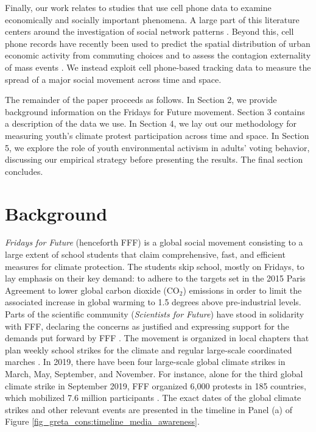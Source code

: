 Finally, our work relates to studies that use cell phone data to examine economically and socially important phenomena. A large part of this literature centers around the investigation of social network patterns \citep{onnela2007structure,onnela2011geographic,kovanen2013temporal}. Beyond this, cell phone records have recently been used to predict the spatial distribution of urban economic activity from commuting choices \citep{NBERw28516} and to assess the contagion externality of mass events \citep{dave2020contagion}. We instead exploit cell phone-based tracking data to measure the spread of a major social movement across time and space.


The remainder of the paper proceeds as follows. In Section 2, we provide background information on the Fridays for Future movement. Section 3 contains a description of the data we use. In Section 4, we lay out our methodology for measuring youth's climate protest participation across time and space. In Section 5, we explore the role of youth environmental activism in adults' voting behavior, discussing our empirical strategy before presenting the results. The final section concludes. 










\bigskip
\section{Background}\label{sec_greta_cons:background}
\afterpage{
	
}
\textit{Fridays for Future} (henceforth FFF) is a global social movement consisting to a large extent of school students that claim comprehensive, fast, and efficient measures for climate protection. The students skip school, mostly on Fridays, to lay emphasis on their key demand: to adhere to the targets set in the 2015 Paris Agreement to lower global carbon dioxide (CO$_2$) emissions in order to limit the associated increase in global warming to 1.5 degrees above pre-industrial levels. Parts of the scientific community (\textit{Scientists for Future}) have stood in solidarity with FFF, declaring the concerns as justified and expressing support for the demands put forward by FFF \citep{warren2019thousands,hagedorn2019science}. The movement is organized in local chapters that plan weekly school strikes for the climate and regular large-scale coordinated marches \citep{smith2019window}. In 2019, there have been four large-scale global climate strikes in March, May, September, and November. For instance, alone for the third global climate strike in September 2019, FFF organized 6,000 protests in 185 countries, which mobilized 7.6 million participants \citep{demoor2020protest}. The exact dates of the global climate strikes and other relevant events are presented in the timeline in Panel (a) of Figure \ref{fig_greta_cons:timeline_media_awareness}.


